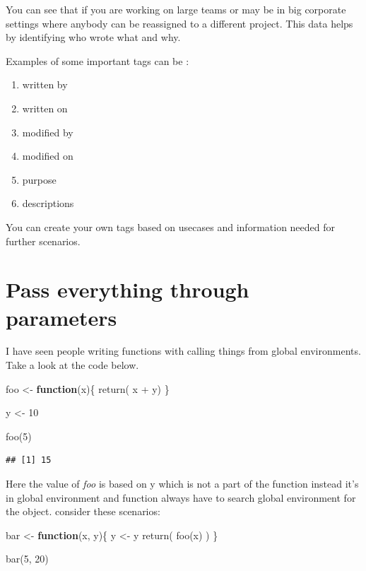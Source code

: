 \documentclass[
]{book}
\newenvironment{Shaded}{\begin{snugshade}}{\end{snugshade}}
\newcommand{\ControlFlowTok}[1]{\textcolor[rgb]{0.13,0.29,0.53}{\textbf{#1}}}
\newcommand{\DecValTok}[1]{\textcolor[rgb]{0.00,0.00,0.81}{#1}}
\newcommand{\FunctionTok}[1]{\textcolor[rgb]{0.00,0.00,0.00}{#1}}
\newcommand{\NormalTok}[1]{#1}
\newcommand{\OtherTok}[1]{\textcolor[rgb]{0.56,0.35,0.01}{#1}}
\newcommand{\SpecialCharTok}[1]{\textcolor[rgb]{0.00,0.00,0.00}{#1}}
\providecommand{\tightlist}{%
  \setlength{\itemsep}{0pt}\setlength{\parskip}{0pt}}
\begin{document}
You can see that if you are working on large teams or may be in big corporate settings where anybody can be reassigned to a different project. This data helps by identifying who wrote what and why.

Examples of some important tags can be :

\begin{enumerate}
\def\labelenumi{\arabic{enumi}.}
\tightlist
\item
  written by
\item
  written on
\item
  modified by
\item
  modified on
\item
  purpose
\item
  descriptions
\end{enumerate}

You can create your own tags based on usecases and information needed for further scenarios.

\hypertarget{pass-everything-through-parameters}{%
\section{Pass everything through parameters}\label{pass-everything-through-parameters}}

I have seen people writing functions with calling things from global environments. Take a look at the code below.

\begin{Shaded}
\begin{Highlighting}[]
\NormalTok{foo }\OtherTok{\textless{}{-}} \ControlFlowTok{function}\NormalTok{(x)\{}
   \FunctionTok{return}\NormalTok{( x }\SpecialCharTok{+}\NormalTok{ y)}
\NormalTok{\}}

\NormalTok{y }\OtherTok{\textless{}{-}} \DecValTok{10}

\FunctionTok{foo}\NormalTok{(}\DecValTok{5}\NormalTok{)}
\end{Highlighting}
\end{Shaded}

\begin{verbatim}
## [1] 15
\end{verbatim}

Here the value of \emph{foo} is based on y which is not a part of the function instead it's in global environment and function always have to search global environment for the object. consider these scenarios:

\begin{Shaded}
\begin{Highlighting}[]
\NormalTok{bar }\OtherTok{\textless{}{-}} \ControlFlowTok{function}\NormalTok{(x, y)\{}
\NormalTok{  y }\OtherTok{\textless{}{-}}\NormalTok{ y}
  \FunctionTok{return}\NormalTok{(}
    \FunctionTok{foo}\NormalTok{(x)}
\NormalTok{  )}
\NormalTok{\}}

\FunctionTok{bar}\NormalTok{(}\DecValTok{5}\NormalTok{, }\DecValTok{20}\NormalTok{)}
\end{Highlighting}
\end{Shaded}
\end{document}
